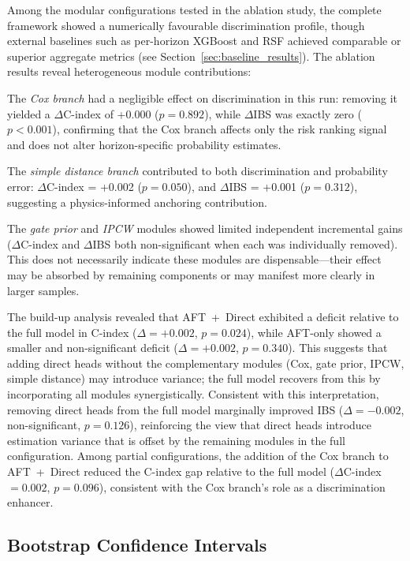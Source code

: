 \documentclass[fire,article,submit,pdftex]{../Definitions/mdpi}
\begin{document}
Among the modular configurations tested in the ablation study, the complete framework showed a numerically favourable discrimination profile, though external baselines such as per-horizon XGBoost and RSF achieved comparable or superior aggregate metrics (see Section~\ref{sec:baseline_results}).
The ablation results reveal heterogeneous module contributions:

The \emph{Cox branch} had a negligible effect on discrimination in this run: removing it yielded a $\Delta$C-index of +0.000 ($p = 0.892$), while $\Delta$IBS was exactly zero ($p < 0.001$), confirming that the Cox branch affects only the risk ranking signal and does not alter horizon-specific probability estimates.

The \emph{simple distance branch} contributed to both discrimination and probability error: $\Delta$C-index = +0.002 ($p = 0.050$), and $\Delta$IBS = +0.001 ($p = 0.312$), suggesting a physics-informed anchoring contribution.

The \emph{gate prior} and \emph{IPCW} modules showed limited independent incremental gains ($\Delta$C-index and $\Delta$IBS both non-significant when each was individually removed).
This does not necessarily indicate these modules are dispensable---their effect may be absorbed by remaining components or may manifest more clearly in larger samples.

The build-up analysis revealed that AFT~+~Direct exhibited a deficit relative to the full model in C-index ($\Delta = +0.002$, $p = 0.024$), while AFT-only showed a smaller and non-significant deficit ($\Delta = +0.002$, $p = 0.340$).
This suggests that adding direct heads without the complementary modules (Cox, gate prior, IPCW, simple distance) may introduce variance; the full model recovers from this by incorporating all modules synergistically.
Consistent with this interpretation, removing direct heads from the full model marginally improved IBS ($\Delta = -0.002$, non-significant, $p = 0.126$), reinforcing the view that direct heads introduce estimation variance that is offset by the remaining modules in the full configuration.
Among partial configurations, the addition of the Cox branch to AFT~+~Direct reduced the C-index gap relative to the full model ($\Delta$C-index~$= 0.002$, $p = 0.096$), consistent with the Cox branch's role as a discrimination enhancer.

\subsection{Bootstrap Confidence Intervals}\label{sec:bootstrap}
\end{document}
